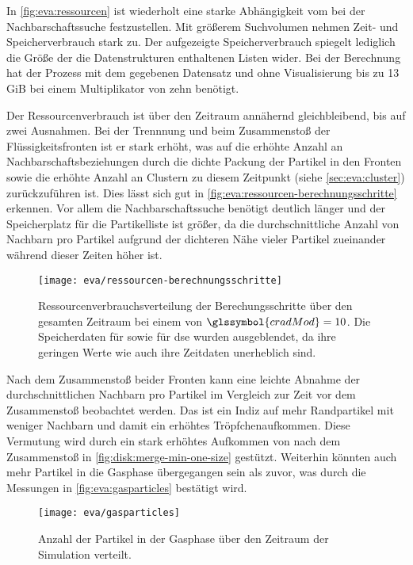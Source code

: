 In \autoref{fig:eva:ressourcen} ist wiederholt eine starke Abhängigkeit vom  bei der Nachbarschaftssuche festzustellen. Mit größerem Suchvolumen nehmen Zeit- und Speicherverbrauch stark zu. Der aufgezeigte Speicherverbrauch spiegelt lediglich die Größe der die Datenstrukturen enthaltenen Listen wider. Bei der Berechnung hat der Prozess mit dem gegebenen Datensatz und ohne Visualisierung bis zu 13 \gls{GiB} bei einem Multiplikator von zehn benötigt.

Der Ressourcenverbrauch ist über den Zeitraum annähernd gleichbleibend, bis auf zwei Ausnahmen. Bei der Trennnung und beim Zusammenstoß der Flüssigkeitsfronten ist er stark erhöht, was auf die erhöhte Anzahl an Nachbarschaftsbeziehungen durch die dichte Packung der Partikel in den Fronten sowie die erhöhte Anzahl an Clustern zu diesem Zeitpunkt (siehe \autoref{sec:eva:cluster}) zurückzuführen ist. Dies lässt sich gut in \autoref{fig:eva:ressourcen-berechnungsschritte} erkennen. Vor allem die Nachbarschaftssuche benötigt deutlich länger und der Speicherplatz für die Partikelliste ist größer, da die durchschnittliche Anzahl von Nachbarn pro Partikel aufgrund der dichteren Nähe vieler Partikel zueinander während dieser Zeiten höher ist.

\begin{figure}
	\texttt{[image: eva/ressourcen-berechnungsschritte]}
	\caption{Ressourcenverbrauchsverteilung der Berechungsschritte über den gesamten Zeitraum bei einem  von $\glssymbol{cradMod} = 10$. Die Speicherdaten für \SECC sowie für \gls{dse} wurden ausgeblendet, da ihre geringen Werte wie auch ihre Zeitdaten unerheblich sind.}\label{fig:eva:ressourcen-berechnungsschritte}
\end{figure}

Nach dem Zusammenstoß beider Fronten kann eine leichte Abnahme der durchschnittlichen Nachbarn pro Partikel im Vergleich zur Zeit vor dem Zusammenstoß beobachtet werden. Das ist ein Indiz auf mehr Randpartikel mit weniger Nachbarn und damit ein erhöhtes Tröpfchenaufkommen. Diese Vermutung wird durch ein stark erhöhtes Aufkommen von  nach dem Zusammenstoß in \autoref{fig:disk:merge-min-one-size} gestützt. Weiterhin könnten auch mehr Partikel in die Gasphase übergegangen sein als zuvor, was durch die Messungen in \autoref{fig:eva:gasparticles} bestätigt wird.

\begin{figure}
	\texttt{[image: eva/gasparticles]}
	\caption{Anzahl der Partikel in der Gasphase über den Zeitraum der Simulation verteilt.}\label{fig:eva:gasparticles}
\end{figure}

